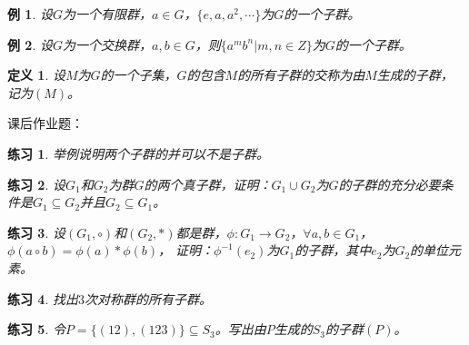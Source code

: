 \documentclass{article}
\newtheorem{Def}{定义}
\newtheorem{Exercise}{练习}
\newtheorem*{Example}{例}
\begin{document}
\begin{CJK*}{UTF8}{gbsn}
\begin{Example}
  设$G$为一个有限群，$a\in G$，$\{e,a,a^2,\cdots\}$为$G$的一个子群。
\end{Example}

\begin{Example}
  设$G$为一个交换群，$a,b\in G$，则$\{a^mb^n|m,n\in Z\}$为$G$的一个子群。
\end{Example}

\begin{Def}
  设$M$为$G$的一个子集，$G$的包含$M$的所有子群的交称为由$M$生成的子群，记为$(M)$。
\end{Def}
课后作业题：
\begin{Exercise}
举例说明两个子群的并可以不是子群。
\end{Exercise}
\begin{Exercise}
  设$G_1$和$G_2$为群$G$的两个真子群，证明：$G_1\cup G_2$为$G$的子群的充分必要条件是$G_1\subseteq G_2$并且$G_2\subseteq G_1$。
\end{Exercise}

\begin{Exercise}
  设$(G_1,\circ)$和$(G_2,*)$都是群，$\phi:G_1\to G_2$，$\forall a,b\in G_1$，$\phi(a\circ b)=\phi(a)*\phi(b)$，
  证明：$\phi^{-1}(e_2)$为$G_1$的子群，其中$e_2$为$G_2$的单位元素。
\end{Exercise}

\begin{Exercise}
  找出$3$次对称群的所有子群。
\end{Exercise}
\begin{Exercise}
  令$P=\{(12),(123)\}\subseteq S_3$。写出由$P$生成的$S_3$的子群$(P)$。
\end{Exercise}
\end{CJK*}
\end{document}
